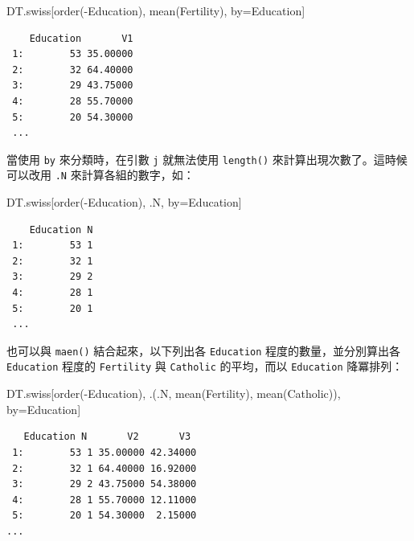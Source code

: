 \documentclass[
]{book}
\newenvironment{Shaded}{\begin{snugshade}}{\end{snugshade}}
\newcommand{\FunctionTok}[1]{\textcolor[rgb]{0.00,0.00,0.00}{#1}}
\newcommand{\NormalTok}[1]{#1}
\newcommand{\OtherTok}[1]{\textcolor[rgb]{0.56,0.35,0.01}{#1}}
\newcommand{\SpecialCharTok}[1]{\textcolor[rgb]{0.00,0.00,0.00}{#1}}
\theoremstyle{definition}
\theoremstyle{remark}
\begin{document}
\begin{Shaded}
\begin{Highlighting}[]
\NormalTok{DT.swiss[}\FunctionTok{order}\NormalTok{(}\SpecialCharTok{{-}}\NormalTok{Education), }\FunctionTok{mean}\NormalTok{(Fertility), by}\OtherTok{=}\NormalTok{Education]}
\end{Highlighting}
\end{Shaded}

\begin{verbatim}
    Education       V1
 1:        53 35.00000
 2:        32 64.40000
 3:        29 43.75000
 4:        28 55.70000
 5:        20 54.30000
 ...
\end{verbatim}

當使用 \texttt{by} 來分類時，在引數 \texttt{j} 就無法使用 \texttt{length()} 來計算出現次數了。這時候可以改用 \texttt{.N} 來計算各組的數字，如：

\begin{Shaded}
\begin{Highlighting}[]
\NormalTok{DT.swiss[}\FunctionTok{order}\NormalTok{(}\SpecialCharTok{{-}}\NormalTok{Education), .N, by}\OtherTok{=}\NormalTok{Education]}
\end{Highlighting}
\end{Shaded}

\begin{verbatim}
    Education N
 1:        53 1
 2:        32 1
 3:        29 2
 4:        28 1
 5:        20 1
 ...
\end{verbatim}

也可以與 \texttt{maen()} 結合起來，以下列出各 \texttt{Education} 程度的數量，並分別算出各 \texttt{Education} 程度的 \texttt{Fertility} 與 \texttt{Catholic} 的平均，而以 \texttt{Education} 降冪排列：

\begin{Shaded}
\begin{Highlighting}[]
\NormalTok{DT.swiss[}\FunctionTok{order}\NormalTok{(}\SpecialCharTok{{-}}\NormalTok{Education), .(.N, }\FunctionTok{mean}\NormalTok{(Fertility), }\FunctionTok{mean}\NormalTok{(Catholic)), by}\OtherTok{=}\NormalTok{Education]}
\end{Highlighting}
\end{Shaded}

\begin{verbatim}
   Education N       V2       V3
 1:        53 1 35.00000 42.34000
 2:        32 1 64.40000 16.92000
 3:        29 2 43.75000 54.38000
 4:        28 1 55.70000 12.11000
 5:        20 1 54.30000  2.15000
...
\end{verbatim}
\end{document}
